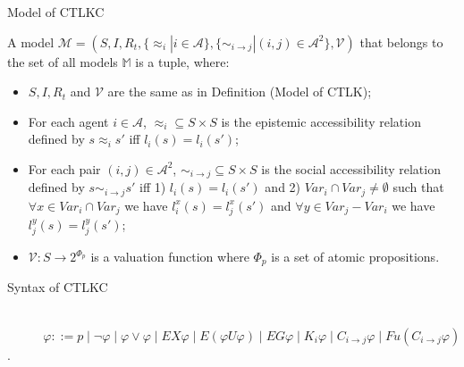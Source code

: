 \documentclass{beamer}
\begin{document}
\begin{frame} {Model of CTLKC}
\begin{definition} \label{Model of CTLKC}
A model $\mathcal{M}=(S,I,R_t,\{\approx_i|i\in \mathcal{ A}\},\{\sim _{i \rightarrow j}|{(i,j)\in \mathcal{A}^2}\},\mathcal{V})$ that belongs to the set of all models $\mathbb{M}$ is a tuple, where:
\begin {itemize}
\item $S, I, R_t$ and $\mathcal{V}$ are the same as in Definition (Model of CTLK);
\item For each agent $i \in \mathcal{A}$, $ \approx _i  \subseteq S \times S
$ is the epistemic accessibility relation defined by $ s \approx_i
s' $ iff $ l_i(s) = l_i(s') $;
\item For each pair $(i, j) \in \mathcal{A}^2 $, $\sim _{i \rightarrow j} \subseteq S \times S $ is the social accessibility relation defined by $ s \sim _{i \rightarrow j} s' $ iff
     1) $ l_i(s) = l_i(s') $ and
     2) $ Var_i \cap Var_j \neq \emptyset $ such that  $ \forall x \in Var_i \cap Var_j $ we have $ l_i^x(s) = l_j^x(s') $ and $ \forall y \in Var_j - Var_i $ we have $ l_j^y(s) = l_j^y(s')$;
\item $ \mathcal{V} : S \rightarrow 2 ^{\Phi_p} $ is a valuation function where $\Phi_p $ is a set of atomic propositions.
\end {itemize}
\label {dfn: Model of CTLKC}
\end{definition}
 \end{frame}
\begin{frame} {Syntax of CTLKC}

\begin{definition}~\\
$ ~~~~~~~~~~~~~\varphi ::= p \mid \neg \varphi \mid \varphi \vee
\varphi \mid EX \varphi  \mid E ( \varphi U \varphi) \mid EG
\varphi\mid K_i \varphi \mid C_{i\rightarrow j} \varphi \mid Fu
(C_{i\rightarrow j}\varphi)$. \label {dfn: Syntax of CTLKC}
\end{definition}

\end{frame}
\end{document}
